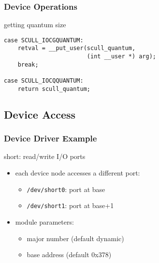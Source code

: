 \documentclass[dvipsnames]{beamer}
\begin{document}
\begin{frame}[fragile]
  \frametitle{Device Operations}

  \begin{exampleblock}{getting quantum size}
    \begin{lstlisting}
case SCULL_IOCGQUANTUM:
    retval = __put_user(scull_quantum,
                        (int __user *) arg);
    break;

case SCULL_IOCQQUANTUM:
    return scull_quantum;
    \end{lstlisting}
  \end{exampleblock}
\end{frame}

\subsection{Device Access}

\begin{frame}
  \frametitle{Device Driver Example}

  \begin{exampleblock}{short: read/write I/O ports}
    \begin{itemize}
      \item each device node accesses a different port:
      \begin{itemize}
        \item \texttt{/dev/short0}: port at base
        \item \texttt{/dev/short1}: port at base+1
      \end{itemize}

      \medskip
      \item module parameters:
      \begin{itemize}
        \item major number (default dynamic)
        \item base address (default 0x378)
      \end{itemize}
    \end{itemize}
  \end{exampleblock}
\end{frame}
\end{document}

